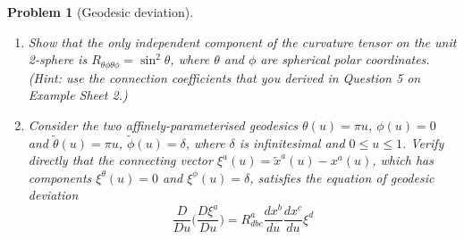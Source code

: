\documentclass[a4paper]{article}
\theoremstyle{new2}
\theoremstyle{new}
\newtheorem{qns}{Problem}[section]
\begin{document}
\begin{qns}[Geodesic deviation]\leavevmode
\begin{enumerate}[label=(\alph*)]
\item  Show that the only independent component of the curvature tensor on the unit 2-sphere is $R_{\theta\phi\theta\phi}=\sin^2\theta$, where $\theta$ and $\phi$ are spherical polar coordinates. (Hint: use the connection coefficients that you derived in Question 5 on Example Sheet 2.)
\item Consider the two affinely-parameterised geodesics $\theta(u)=\pi u$, $\phi(u)=0$ and $\tilde{\theta}(u)=\pi u$, $\tilde{\phi}(u)=\delta$, where $\delta$ is infinitesimal and $0\leq u \leq1$. Verify directly that the connecting vector $\xi^a(u)=\tilde{x}^a(u)-x^a(u)$, which has components $\xi^\theta(u)=0$ and $\xi^\phi(u)=\delta$, satisfies the equation of geodesic deviation
\begin{equation}
    \frac{D}{Du}\bigg(\frac{D\xi^a}{Du}\bigg)=R_{dbc}^a\frac{dx^b}{du}\frac{dx^c}{du}\xi^d\tag{*}
\end{equation}
\end{enumerate}
\end{qns}
\end{document}
